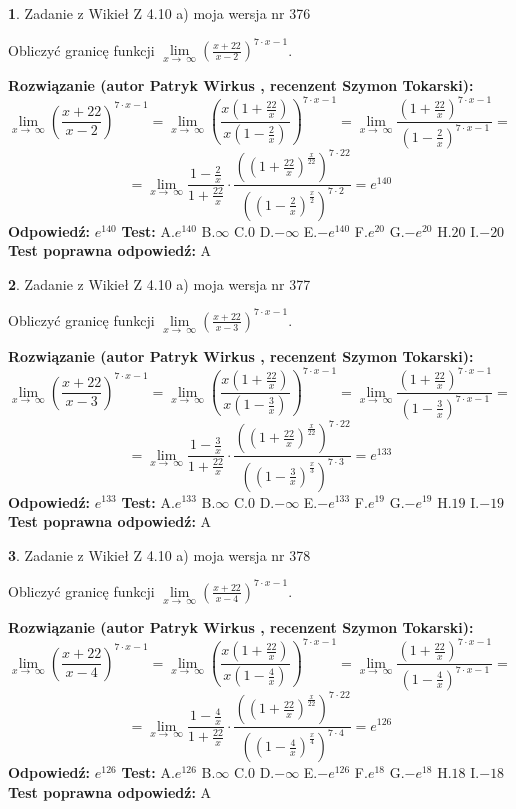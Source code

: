 \documentclass[12pt, a4paper]{article}
\theoremstyle{definition} %
\newtheorem{zad}{}
\newcommand{\zadStart}[1]{\begin{zad}#1\newline}
\newcommand{\zadStop}{\end{zad}}
\newcommand{\rozwStart}[2]{\noindent \textbf{Rozwiązanie (autor #1 , recenzent #2): }\newline}
\newcommand{\rozwStop}{\newline}
\newcommand{\odpStart}{\noindent \textbf{Odpowiedź:}\newline}
\newcommand{\odpStop}{\newline}
\newcommand{\testStart}{\noindent \textbf{Test:}\newline}
\newcommand{\testStop}{\newline}
\newcommand{\kluczStart}{\noindent \textbf{Test poprawna odpowiedź:}\newline}
\newcommand{\kluczStop}{\newline}
\begin{document}
\zadStart{Zadanie z Wikieł Z 4.10 a) moja wersja nr 376}

Obliczyć granicę funkcji  $\lim\limits_{x\to\ \infty}(\frac{x+22}{x-2})^{7\cdot x-1}$.
\zadStop
\rozwStart{Patryk Wirkus}{Szymon Tokarski}
$$\lim\limits_{x\to\ \infty}(\frac{x+22}{x-2})^{7\cdot x-1} = \lim\limits_{x\to\ \infty}(\frac{x(1+\frac{22}{x})}{x(1-\frac{2}{x})})^{7\cdot x-1}=\lim\limits_{x\to\ \infty}\frac{(1+\frac{22}{x})^{7\cdot x-1}}{(1-\frac{2}{x})^{7\cdot x-1}}=$$
$$=\lim\limits_{x\to\ \infty}\frac{1-\frac{2}{x}}{1+\frac{22}{x}}\cdot\frac{((1+\frac{22}{x})^{\frac{x}{22}})^{7\cdot22}}{((1-\frac{2}{x})^{\frac{x}{2}})^{7\cdot2}}=e^{140}$$
\rozwStop
\odpStart
$e^{140}$
\odpStop
\testStart
A.$e^{140}$ B.$\infty$ C.$0$ D.$-\infty$ E.$-e^{140}$
F.$e^{20}$ G.$-e^{20}$
H.$20$
I.$-20$
\testStop
\kluczStart
A
\kluczStop



\zadStart{Zadanie z Wikieł Z 4.10 a) moja wersja nr 377}

Obliczyć granicę funkcji  $\lim\limits_{x\to\ \infty}(\frac{x+22}{x-3})^{7\cdot x-1}$.
\zadStop
\rozwStart{Patryk Wirkus}{Szymon Tokarski}
$$\lim\limits_{x\to\ \infty}(\frac{x+22}{x-3})^{7\cdot x-1} = \lim\limits_{x\to\ \infty}(\frac{x(1+\frac{22}{x})}{x(1-\frac{3}{x})})^{7\cdot x-1}=\lim\limits_{x\to\ \infty}\frac{(1+\frac{22}{x})^{7\cdot x-1}}{(1-\frac{3}{x})^{7\cdot x-1}}=$$
$$=\lim\limits_{x\to\ \infty}\frac{1-\frac{3}{x}}{1+\frac{22}{x}}\cdot\frac{((1+\frac{22}{x})^{\frac{x}{22}})^{7\cdot22}}{((1-\frac{3}{x})^{\frac{x}{3}})^{7\cdot3}}=e^{133}$$
\rozwStop
\odpStart
$e^{133}$
\odpStop
\testStart
A.$e^{133}$ B.$\infty$ C.$0$ D.$-\infty$ E.$-e^{133}$
F.$e^{19}$ G.$-e^{19}$
H.$19$
I.$-19$
\testStop
\kluczStart
A
\kluczStop



\zadStart{Zadanie z Wikieł Z 4.10 a) moja wersja nr 378}

Obliczyć granicę funkcji  $\lim\limits_{x\to\ \infty}(\frac{x+22}{x-4})^{7\cdot x-1}$.
\zadStop
\rozwStart{Patryk Wirkus}{Szymon Tokarski}
$$\lim\limits_{x\to\ \infty}(\frac{x+22}{x-4})^{7\cdot x-1} = \lim\limits_{x\to\ \infty}(\frac{x(1+\frac{22}{x})}{x(1-\frac{4}{x})})^{7\cdot x-1}=\lim\limits_{x\to\ \infty}\frac{(1+\frac{22}{x})^{7\cdot x-1}}{(1-\frac{4}{x})^{7\cdot x-1}}=$$
$$=\lim\limits_{x\to\ \infty}\frac{1-\frac{4}{x}}{1+\frac{22}{x}}\cdot\frac{((1+\frac{22}{x})^{\frac{x}{22}})^{7\cdot22}}{((1-\frac{4}{x})^{\frac{x}{4}})^{7\cdot4}}=e^{126}$$
\rozwStop
\odpStart
$e^{126}$
\odpStop
\testStart
A.$e^{126}$ B.$\infty$ C.$0$ D.$-\infty$ E.$-e^{126}$
F.$e^{18}$ G.$-e^{18}$
H.$18$
I.$-18$
\testStop
\kluczStart
A
\kluczStop
\end{document}
